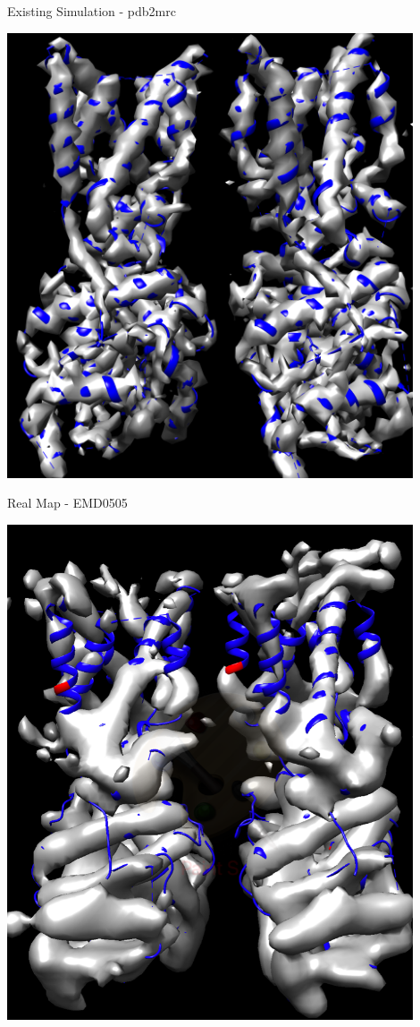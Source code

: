 \begin{minipage}{0.209\textwidth}
{\Large Existing Simulation - pdb2mrc}
        \begin{tikzfigure}
           \includegraphics[width=0.9\textwidth]{mol_map.png}
        \end{tikzfigure}
\end{minipage}
\begin{minipage}{0.209\textwidth}
{\Large Real Map - EMD0505}
        \begin{tikzfigure}
           \includegraphics[width=0.9\textwidth]{real_map.png}
        \end{tikzfigure}
\end{minipage}
